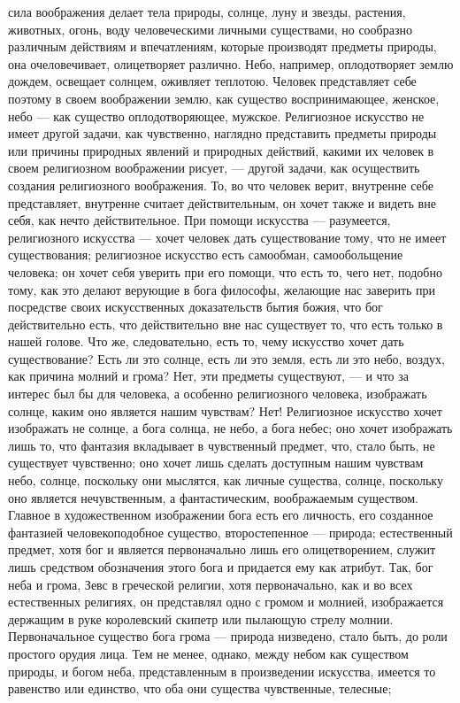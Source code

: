 \documentclass[12pt]{article}
\begin{document}
сила воображения делает тела природы, солнце, луну и звезды, растения, животных, огонь, воду человеческими личными существами, но сообразно различным действиям и впечатлениям, которые производят предметы природы, она очеловечивает, олицетворяет различно. Небо, например, оплодотворяет землю дождем, освещает солнцем, оживляет теплотою. Человек представляет себе поэтому в своем воображении землю, как существо воспринимающее, женское, небо --- как существо оплодотворяющее, мужское. Религиозное искусство не имеет другой задачи, как чувственно, наглядно представить предметы природы или причины природных явлений и природных действий, какими их человек в своем религиозном воображении рисует, --- другой задачи, как осуществить создания религиозного воображения. То, во что человек верит, внутренне себе представляет, внутренне считает действительным, он хочет также и видеть вне себя, как нечто действительное. При помощи искусства --- разумеется, религиозного искусства --- хочет человек дать существование тому, что не имеет существования; религиозное искусство есть самообман, самообольщение человека; он хочет себя уверить при его помощи, что есть то, чего нет, подобно тому, как это делают верующие в бога философы, желающие нас заверить при посредстве своих искусственных доказательств бытия божия, что бог действительно есть, что действительно вне нас существует то, что есть только в нашей голове. Что же, следовательно, есть то, чему искусство хочет дать существование? Есть ли это солнце, есть ли это земля, есть ли это небо, воздух, как причина молний и грома? Нет, эти предметы существуют, --- и что за интерес был бы для человека, а особенно религиозного человека, изображать солнце, каким оно является нашим чувствам? Нет! Религиозное искусство хочет изображать не солнце, а бога солнца, не небо, а бога небес; оно хочет изображать лишь то, что фантазия вкладывает в чувственный предмет, что, стало быть, не существует чувственно; оно хочет лишь сделать доступным нашим чувствам небо, солнце, поскольку они мыслятся, как личные существа, солнце, поскольку оно является нечувственным, а фантастическим, воображаемым существом. Главное в художественном изображении бога есть его личность, его созданное фантазией человекоподобное существо, второстепенное --- природа; естественный предмет, хотя бог и является первоначально лишь его олицетворением, служит лишь средством обозначения этого бога и придается ему как атрибут. Так, бог неба и грома, Зевс в греческой религии, хотя первоначально, как и во всех естественных религиях, он представлял одно с громом и молнией, изображается держащим в руке королевский скипетр или пылающую стрелу молнии. Первоначальное существо бога грома --- природа низведено, стало быть, до роли простого орудия лица. Тем не менее, однако, между небом как существом природы, и богом неба, представленным в произведении искусства, имеется то равенство или единство, что оба они существа чувственные, телесные; 
\end{document}
